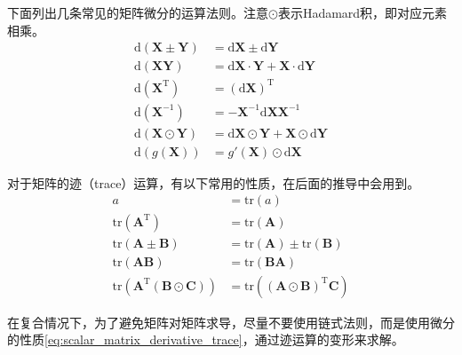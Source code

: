 下面列出几条常见的矩阵微分的运算法则。注意$\odot$表示Hadamard积，即对应元素相乘。
\begin{subequations}
	\begin{align}
		\mathrm{d}(\bm{X}\pm \bm{Y}) &= \mathrm{d}\bm{X} \pm \mathrm{d}\bm{Y} 
		\label{eq:matrix_derivative_add_sub} \\
		\mathrm{d}(\bm{XY}) &= \mathrm{d}\bm{X}\cdot \bm{Y} + \bm{X}\cdot \mathrm{d}\bm{Y}
		\label{eq:matrix_derivative_mul} \\
		\mathrm{d}(\bm{X}^{\mathrm{T}}) &= (\mathrm{d}\bm{X})^{\mathrm{T}}
		\label{eq:matrix_derivative_transpose} \\
		\mathrm{d}(\bm{X}^{-1}) &= -\bm{X}^{-1}\mathrm{d}\bm{X}\bm{X}^{-1}
		\label{eq:matrix_derivative_inverse} \\
		\mathrm{d}(\bm{X}\odot \bm{Y}) &= \mathrm{d}\bm{X}\odot \bm{Y} + \bm{X}\odot \mathrm{d}\bm{Y}
		\label{eq:matrix_derivative_hadamard} \\
		\mathrm{d}\left(g(\bm{X})\right) &= g'(\bm{X}) \odot \mathrm{d}\bm{X}
		\label{eq:matrix_derivative_hadamard2}
	\end{align}
\end{subequations}

对于矩阵的迹（trace）运算，有以下常用的性质，在后面的推导中会用到。
\begin{subequations}
	\begin{align}
		a &= \mathrm{tr}(a)
		\label{eq:matrix_trace_scalar} \\
		\mathrm{tr}(\bm{A}^{\mathrm{T}}) &= \mathrm{tr}(\bm{A})
		\label{eq:matrix_trace_transpose} \\
		\mathrm{tr}(\bm{A}\pm\bm{B}) &= \mathrm{tr}(\bm{A}) \pm \mathrm{tr}(\bm{B})
		\label{eq:matrix_trace_add_sub} \\
		\mathrm{tr}(\bm{AB}) &= \mathrm{tr}(\bm{BA})
		\label{eq:matrix_trace_mul} \\
		\mathrm{tr}\left(\bm{A}^{\mathrm{T}}(\bm{B} \odot \bm{C})\right) &= \mathrm{tr}\left((\bm{A} \odot \bm{B})^{\mathrm{T}}\bm{C}\right)
		\label{eq:matrix_trace_hadamard}
	\end{align}
\end{subequations}

在复合情况下，为了避免矩阵对矩阵求导，尽量不要使用链式法则，而是使用微分的性质\eqref{eq:scalar_matrix_derivative_trace}，通过迹运算的变形来求解。

